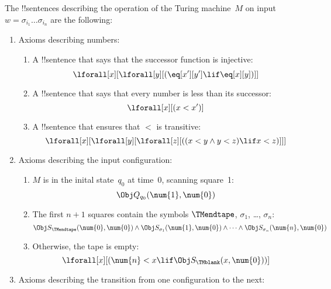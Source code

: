 \documentclass[../../../include/open-logic-section]{subfiles}
\begin{document}
The !!{sentence}s describing the operation of the Turing machine~$M$ on
input $w = \sigma_{i_1}\dots\sigma_{i_n}$ are the following:
\begin{enumerate}
\item Axioms describing numbers:
\begin{enumerate}
\item A !!{sentence} that says that the successor function is injective:
\[
\lforall[x][\lforall[y][
    (\eq[x'][y'] \lif \eq[x][y])]]
\]
\item A !!{sentence} that says that every number is less than its successor:
\[
\lforall[x][(x < x')]
\]
\item A !!{sentence} that ensures that $<$ is transitive:
\[
\lforall[x][\lforall[y][\lforall[z][
      ((x < y \land y < z) \lif x < z)]]]
\]
\end{enumerate}
\item Axioms describing the input configuration:
\begin{enumerate}
\item $M$ is in the inital state~$q_0$ at time~0, scanning square~1:
\[
\Obj Q_{q_0}(\num{1}, \num{0})
\]
\item The first $n+1$ squares contain the symbols $\TMendtape$,
  $\sigma_{1}$, \dots, $\sigma_{n}$:
\[
\Obj S_\TMendtape(\num{0}, \num{0}) \land
\Obj S_{\sigma_1}(\num{1}, \num{0}) \land
\dots \land
\Obj S_{\sigma_n}(\num{n}, \num{0})
\]
\item Otherwise, the tape is empty:
\[
\lforall[x][(\num{n} < x \lif \Obj S_\TMblank(x, \num{0}))]
\]
\end{enumerate}
\item Axioms describing the transition from one configuration to
  the next:


\end{enumerate}
\end{document}
